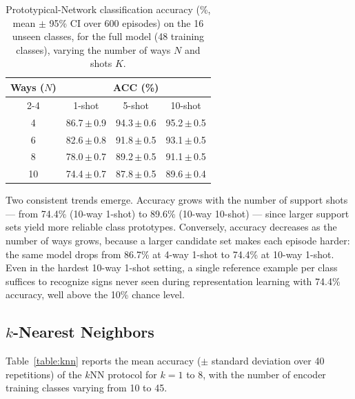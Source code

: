 \documentclass{article}
\begin{document}
\begin{table}[h!]\centering
\small
\begin{tabular}{cccc}\toprule
\multirow{2}{*}{\textbf{Ways ($N$)}} &\multicolumn{3}{c}{\textbf{ACC (\%)}} \\\cmidrule{2-4}
&1-shot &5-shot &10-shot \\\midrule
4  &86.7\,$\pm$\,0.9 &94.3\,$\pm$\,0.6 &95.2\,$\pm$\,0.5 \\
6  &82.6\,$\pm$\,0.8 &91.8\,$\pm$\,0.5 &93.1\,$\pm$\,0.5 \\
8  &78.0\,$\pm$\,0.7 &89.2\,$\pm$\,0.5 &91.1\,$\pm$\,0.5 \\
10 &74.4\,$\pm$\,0.7 &87.8\,$\pm$\,0.5 &89.6\,$\pm$\,0.4 \\
\bottomrule
\end{tabular}
\caption{Prototypical-Network classification accuracy (\%, mean $\pm$ 95\% CI over 600 episodes) on the 16 unseen classes, for the full model (48 training classes), varying the number of ways $N$ and shots $K$.}\label{tab:shots_1}
\end{table}

Two consistent trends emerge. Accuracy grows with the number of support shots --- from 74.4\% (10-way 1-shot) to 89.6\% (10-way 10-shot) --- since larger support sets yield more reliable class prototypes. Conversely, accuracy decreases as the number of ways grows, because a larger candidate set makes each episode harder: the same model drops from 86.7\% at 4-way 1-shot to 74.4\% at 10-way 1-shot. Even in the hardest 10-way 1-shot setting, a single reference example per class suffices to recognize signs never seen during representation learning with 74.4\% accuracy, well above the 10\% chance level.

\subsection{$k$-Nearest Neighbors}
Table~\ref{table:knn} reports the mean accuracy ($\pm$ standard deviation over 40 repetitions) of the $k$NN protocol for $k=1$ to $8$, with the number of encoder training classes varying from 10 to 45.
\end{document}
